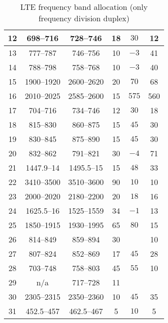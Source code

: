 \begin{table}[]
\begin{tabular}{|c|c|c|c|c|c|}
    12 & 698--716   & 728--746   & 18 & $30$  & 12  \\ \hline
    13 & 777--787   & 746--756   & 10 & $-3$  & 41  \\ \hline
    14 & 788--798   & 758--768   & 10 & $-3$  & 40  \\ \hline
    15 & 1900--1920 & 2600--2620 & 20 & $70$  & 68  \\ \hline
    16 & 2010--2025 & 2585--2600 & 15 & $575$ & 560 \\ \hline
    17 & 704--716   & 734--746   & 12 & $30$  & 18  \\ \hline
    18 & 815--830   & 860--875   & 15 & $45$  & 30  \\ \hline
    19 & 830--845   & 875--890   & 15 & $45$  & 30  \\ \hline
    20 & 832--862   & 791--821   & 30 & $-4$  &  71  \\ \hline
    21 & 1447.9--14 & 1495.5--15 & 15 & $48$  & 33  \\ \hline
    22 & 3410--3500 & 3510--3600 & 90 & $10$  & 10  \\ \hline
    23 & 2000--2020 & 2180--2200 & 20 & $18$  & 16  \\ \hline
    24 & 1625.5--16 & 1525--1559 & 34 & $-1$  & 13  \\ \hline
    25 & 1850--1915 & 1930--1995 & 65 & $80$  & 15  \\ \hline
    26 & 814--849   & 859--894   & 30 &       & 10  \\ \hline
    27 & 807--824   & 852--869   & 17 & $45$  & 28  \\ \hline
    28 & 703--748   & 758--803   & 45 & $55$  & 10  \\ \hline
    29 & n/a        & 717--728   & 11 &       & \\ \hline
    30 & 2305--2315 & 2350--2360 & 10 & $45$  & 35  \\ \hline
    31 & 452.5--457 & 462.5--467 & 5  & $10$  & 5   \\ \hline
  \end{tabular}
  \caption{LTE frequency band allocation (only frequency division duplex) \cite{radio2015electronics}}
  \label{tab:ltefreqband}
\end{table}


